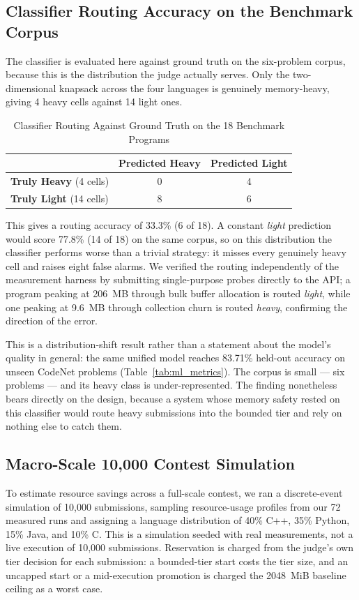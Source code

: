 \documentclass[conference]{IEEEtran}
\begin{document}
\subsection{Classifier Routing Accuracy on the Benchmark Corpus}
\label{sec:classifier_eval}
The classifier is evaluated here against ground truth on the six-problem corpus, because this is the distribution the judge actually serves. Only the two-dimensional knapsack across the four languages is genuinely memory-heavy, giving 4 heavy cells against 14 light ones.

\begin{table}[!t]
\caption{Classifier Routing Against Ground Truth on the 18 Benchmark Programs}
\label{tab:classifier_routing}
\centering
\small
\begin{tabular}{|l|c|c|}
\hline
& \textbf{Predicted Heavy} & \textbf{Predicted Light} \\
\hline
\textbf{Truly Heavy} (4 cells) & 0 & 4 \\
\hline
\textbf{Truly Light} (14 cells) & 8 & 6 \\
\hline
\end{tabular}
\end{table}

This gives a routing accuracy of 33.3\% (6 of 18). A constant \emph{light} prediction would score 77.8\% (14 of 18) on the same corpus, so on this distribution the classifier performs worse than a trivial strategy: it misses every genuinely heavy cell and raises eight false alarms. We verified the routing independently of the measurement harness by submitting single-purpose probes directly to the API; a program peaking at 206~MB through bulk buffer allocation is routed \emph{light}, while one peaking at 9.6~MB through collection churn is routed \emph{heavy}, confirming the direction of the error.

This is a distribution-shift result rather than a statement about the model's quality in general: the same unified model reaches 83.71\% held-out accuracy on unseen CodeNet problems (Table~\ref{tab:ml_metrics}). The corpus is small --- six problems --- and its heavy class is under-represented. The finding nonetheless bears directly on the design, because a system whose memory safety rested on this classifier would route heavy submissions into the bounded tier and rely on nothing else to catch them.

\subsection{Macro-Scale 10,000 Contest Simulation}
To estimate resource savings across a full-scale contest, we ran a discrete-event simulation of 10,000 submissions, sampling resource-usage profiles from our 72 measured runs and assigning a language distribution of 40\% C++, 35\% Python, 15\% Java, and 10\% C. This is a simulation seeded with real measurements, not a live execution of 10,000 submissions. Reservation is charged from the judge's own tier decision for each submission: a bounded-tier start costs the tier size, and an uncapped start or a mid-execution promotion is charged the 2048~MiB baseline ceiling as a worst case.
\end{document}

